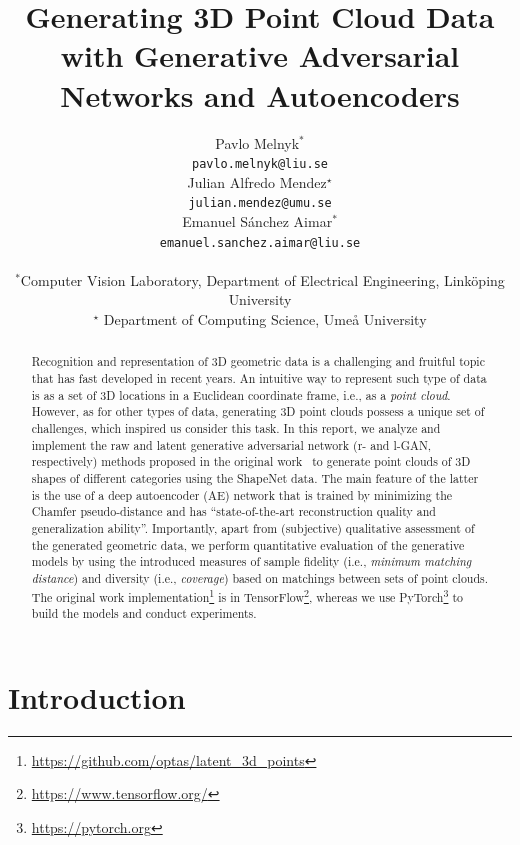 \documentclass[12pt]{article}
\title{Generating 3D Point Cloud Data with Generative Adversarial Networks and Autoencoders}
\author{
    Pavlo Melnyk$^*$ \\
    \texttt{pavlo.melnyk@liu.se} \\
    \And
    Julian Alfredo Mendez$^\star $ \\
    \texttt{julian.mendez@umu.se} \\
    \And
    Emanuel S\'{a}nchez Aimar$^*$ \\
    \texttt{emanuel.sanchez.aimar@liu.se} \\
    \\
    {\small $^*$Computer Vision Laboratory, Department of Electrical Engineering, Linköping University} \\
    {\small $^\star$ Department of Computing Science, Umeå University}
}
\newcommand{\contentdescription}[1]{}
\begin{document}
    \maketitle

    \begin{abstract}
        \contentdescription{
            Abstract (5-10\%):
            Give an overview of what you have done in the project with the key results and findings of your work.
            Should be no more than 300 words.
        }

        Recognition and representation of 3D geometric data is a challenging and fruitful topic that has fast developed in recent years. An intuitive way to represent such type of data is as a set of 3D locations in a Euclidean coordinate frame, i.e., as a \textit{point cloud}. However, as for other types of data, generating 3D point clouds possess a unique set of challenges, which inspired us consider this task.
        In this report,  we analyze and implement the raw and latent generative adversarial network (r- and l-GAN, respectively) methods proposed in the original work~\cite{pmlr-v80-achlioptas18a} to generate point clouds of 3D shapes of different categories using the ShapeNet data. The main feature of the latter is the use of a deep autoencoder (AE) network that is trained by minimizing the Chamfer pseudo-distance and has ``state-of-the-art reconstruction quality and generalization ability''.
        Importantly, apart from (subjective) qualitative assessment of the generated geometric data, we perform quantitative evaluation of the generative models by using the introduced measures of sample fidelity (i.e., \textit{minimum matching distance}) and diversity (i.e., \textit{coverage}) based on matchings between sets of point clouds.
        The original work implementation\footnote{\url{https://github.com/optas/latent_3d_points}} is in TensorFlow\footnote{\url{https://www.tensorflow.org/}}, whereas we use PyTorch\footnote{\url{https://pytorch.org}} to build the models and conduct experiments.
    \end{abstract}


    \section{Introduction}

    \contentdescription{
        Introduction (5-15\%):
        Describe the problem, the approach of the paper, the experiments, and the results.
        At the high-level talk about what you worked on in your project and why it is important.
        Then give an overview of your results.
    }
\end{document}
